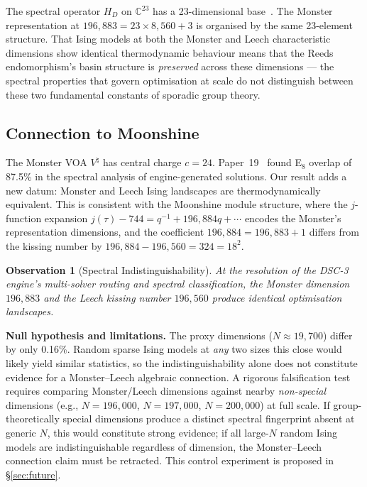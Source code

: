 \documentclass[11pt,a4paper]{article}
\newtheorem{observation}{Observation}[section]
\begin{document}
The spectral operator $H_D$ on $\mathbb{C}^{23}$ has a 23-dimensional base~\cite{u24_spectral}.
The Monster representation at $196{,}883 = 23 \times 8{,}560 + 3$ is organised by the same 23-element structure.
That Ising models at both the Monster and Leech characteristic dimensions show identical thermodynamic behaviour means that the Reeds endomorphism's basin structure is \emph{preserved} across these dimensions --- the spectral properties that govern optimisation at scale do not distinguish between these two fundamental constants of sporadic group theory.

\subsection{Connection to Moonshine}

The Monster VOA $V^\natural$ has central charge $c = 24$.
Paper~19~\cite{dwr_papers} found E$_8$ overlap of 87.5\% in the spectral analysis of engine-generated solutions.
Our result adds a new datum: Monster and Leech Ising landscapes are thermodynamically equivalent.
This is consistent with the Moonshine module structure, where the $j$-function expansion $j(\tau) - 744 = q^{-1} + 196{,}884q + \cdots$ encodes the Monster's representation dimensions, and the coefficient $196{,}884 = 196{,}883 + 1$ differs from the kissing number by $196{,}884 - 196{,}560 = 324 = 18^2$.

\begin{observation}[Spectral Indistinguishability]\label{obs:monster}
At the resolution of the DSC-3 engine's multi-solver routing and spectral classification, the Monster dimension $196{,}883$ and the Leech kissing number $196{,}560$ produce identical optimisation landscapes.
\end{observation}

\noindent\textbf{Null hypothesis and limitations.}
The proxy dimensions ($N \approx 19{,}700$) differ by only 0.16\%.
Random sparse Ising models at \emph{any} two sizes this close would likely yield similar statistics, so the indistinguishability alone does not constitute evidence for a Monster--Leech algebraic connection.
A rigorous falsification test requires comparing Monster/Leech dimensions against nearby \emph{non-special} dimensions (e.g., $N = 196{,}000$, $N = 197{,}000$, $N = 200{,}000$) at full scale.
If group-theoretically special dimensions produce a distinct spectral fingerprint absent at generic $N$, this would constitute strong evidence; if all large-$N$ random Ising models are indistinguishable regardless of dimension, the Monster--Leech connection claim must be retracted.
This control experiment is proposed in \S\ref{sec:future}.
\end{document}

